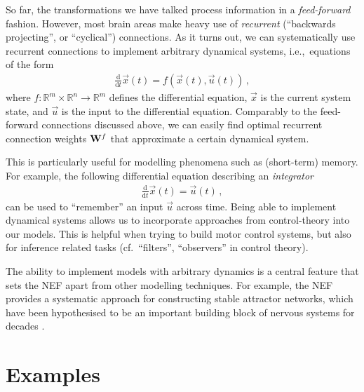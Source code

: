 \documentclass[10pt,letterpaper,oneside]{article}
\begin{document}
So far, the transformations we have talked process information in a \emph{feed-forward} fashion. However, most brain areas make heavy use of \emph{recurrent} (\enquote{backwards projecting}, or \enquote{cyclical}) connections. As it turns out, we can systematically use recurrent connections to implement arbitrary dynamical systems, i.e.,~equations of the form
\begin{align*}
	\frac{\mathrm{d}}{\mathrm{d}t} \vec x(t) = f(\vec x(t), \vec u(t)) \,,
\end{align*}
where $f : \mathbb{R}^m \times \mathbb{R}^n \rightarrow \mathbb{R}^m$ defines the differential equation, $\vec x$ is the current system state, and $\vec u$ is the input to the differential equation. Comparably to the feed-forward connections discussed above, we can easily find optimal recurrent connection weights ${{\mathbf{W}}}^f$ that approximate a certain dynamical system.

This is particularly useful for modelling phenomena such as (short-term) memory. For example, the following differential equation describing an \emph{integrator}
\begin{align*}
	\frac{\mathrm{d}}{\mathrm{d}t} \vec x(t) = \vec u(t) \,,
\end{align*}
can be used to \enquote{remember} an input $\vec u$ across time. Being able to implement dynamical systems allows us to incorporate approaches from control-theory into our models. This is helpful when trying to build motor control systems, but also for inference related tasks (cf.~\enquote{filters}, \enquote{observers} in control theory).

The ability to implement models with arbitrary dynamics is a central feature that sets the NEF apart from other modelling techniques. For example, the NEF provides a systematic approach for constructing stable attractor networks, which have been hypothesised to be an important building block of nervous systems for decades \cite{eliasmith2005unified}.


\section{Examples}
\label{sec:examples}
\end{document}
